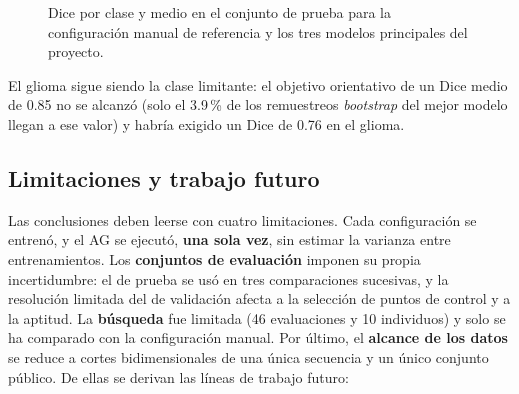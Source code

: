 \begin{figure}[htbp]
  \centering
  \caption{Dice por clase y medio en el conjunto de prueba para la configuración manual de referencia y los tres modelos principales del proyecto.}
  \label{fig:prueba-final}
\end{figure}

El glioma sigue siendo la clase limitante: el objetivo orientativo de un Dice medio de 0.85 no se alcanzó (solo el 3.9\,\% de los remuestreos \emph{bootstrap} del mejor modelo llegan a ese valor) y habría exigido un Dice de 0.76 en el glioma.

\subsection{Limitaciones y trabajo futuro}\label{subsec:amenazas}

Las conclusiones deben leerse con cuatro limitaciones. Cada configuración se entrenó, y el AG se ejecutó, \textbf{una sola vez}, sin estimar la varianza entre entrenamientos. Los \textbf{conjuntos de evaluación} imponen su propia incertidumbre: el de prueba se usó en tres comparaciones sucesivas, y la resolución limitada del de validación afecta a la selección de puntos de control y a la aptitud. La \textbf{búsqueda} fue limitada (46 evaluaciones y 10 individuos) y solo se ha comparado con la configuración manual. Por último, el \textbf{alcance de los datos} se reduce a cortes bidimensionales de una única secuencia y un único conjunto público. De ellas se derivan las líneas de trabajo futuro:
\label{subsec:futuro}


